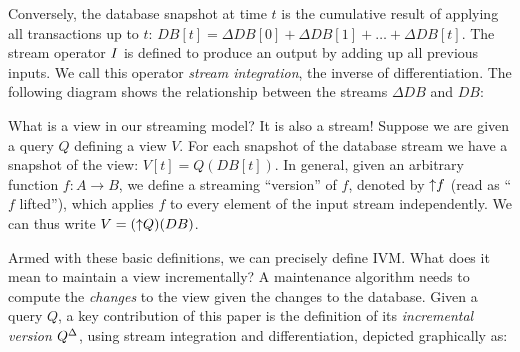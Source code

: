 Conversely, the database snapshot at time $t$ is the cumulative result
of applying all transactions up to $t$: $DB[t] = \Delta DB[0] + \Delta
DB[1] + \ldots + \Delta DB[t]$.  The stream operator $\mathit{I}$ is defined
to produce an output by adding up all previous inputs.  We call this
operator \emph{stream integration}, the inverse of differentiation.
The following diagram shows the relationship between the streams
$\Delta DB$ and $DB$:
\begin{center}
\end{center}

What is a view in our streaming model?  It is also a stream!  Suppose
we are given a query $Q$ defining a view $V$.  For each snapshot of
the database stream we have a snapshot of the view: $V[t] = Q(DB[t])$.
In general, given an arbitrary function $f: A \to B$, we define a
streaming ``version'' of $f$, denoted by ${\uparrow}f$ (read as ``$f$
lifted''), which applies $f$ to every element of the input stream
independently.  We can thus write $V = ({\uparrow}Q)(DB)$.

Armed with these basic definitions, we can precisely define IVM.  What
does it mean to maintain a view incrementally?  A maintenance
algorithm needs to compute the \emph{changes} to the view given the
changes to the database. Given a query $Q$, a key contribution of this
paper is the definition of its \emph{incremental version} ${Q}^{\Delta}$,
using stream integration and differentiation, depicted graphically as:

\begin{center}
\end{center}

